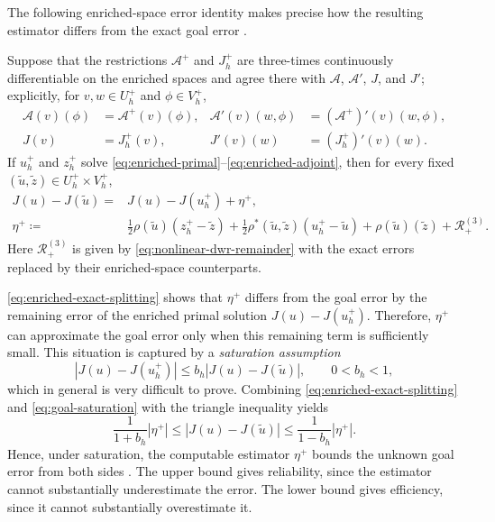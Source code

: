 The following enriched-space error identity makes precise how the resulting estimator differs from the exact goal error \cite[Theorem~2]{ENDTMAYER202419}.
\begin{theorem}
\label{thm:enriched-space-dwr}
Suppose that the restrictions \(\mathcal A^+\) and \(J_h^+\) are three-times continuously differentiable on the enriched spaces and agree there with \(\mathcal A\), \(\mathcal A'\), \(J\), and \(J'\); explicitly, for \(v,w\in U_h^+\) and \(\phi\in V_h^+\),
\begin{align*}
 \mathcal A(v)(\phi)
 &=\mathcal A^+(v)(\phi),
 &
 \mathcal A'(v)(w,\phi)
 &=(\mathcal A^+)'(v)(w,\phi),\\
 J(v)&=J_h^+(v),
 &
 J'(v)(w)&=(J_h^+)'(v)(w).
\end{align*}
If \(u_h^+\) and \(z_h^+\) solve \eqref{eq:enriched-primal}--\eqref{eq:enriched-adjoint}, then for every fixed \((\widetilde u,\widetilde z)\in U_h^+\times V_h^+\),
\begin{align}
 J(u)-J(\widetilde u)
 ={}&J(u)-J(u_h^+)+\eta^+,
 \label{eq:enriched-exact-splitting}\\
 \eta^+
 \coloneqq{}&\tfrac12\rho(\widetilde u)(z_h^+-\widetilde z)
 +\tfrac12\rho^\ast(\widetilde u,\widetilde z)
  (u_h^+-\widetilde u)
 +\rho(\widetilde u)(\widetilde z)
 +\mathcal R_+^{(3)}.
 \label{eq:enriched-nonlinear-dwr}
\end{align}
Here \(\mathcal R_+^{(3)}\) is given by \eqref{eq:nonlinear-dwr-remainder} with the exact errors replaced by their enriched-space counterparts.
\end{theorem}

\cref{eq:enriched-exact-splitting} shows that \(\eta^+\) differs from the goal error by the remaining error of the enriched primal solution \(J(u)-J(u_h^+)\). Therefore, \(\eta^+\) can approximate the goal error only when this remaining term is sufficiently small. This situation is captured by a \emph{saturation assumption} \cite{saturation}
\begin{equation}
|J(u)-J(u_h^+)|
\le b_h |J(u)-J(\widetilde u)|,
\qquad 0<b_h<1,
\label{eq:goal-saturation}
\end{equation}
which in general is very difficult to prove.
Combining \eqref{eq:enriched-exact-splitting} and \eqref{eq:goal-saturation} with the triangle inequality yields
\begin{equation}
\frac{1}{1+b_h}|\eta^+|
\le |J(u)-J(\widetilde u)|
\le \frac{1}{1-b_h}|\eta^+|.
\label{eq:enriched-reliability-efficiency}
\end{equation}
Hence, under saturation, the computable estimator \(\eta^+\) bounds the unknown goal error from both sides \cite{reli_eff}. The upper bound gives reliability, since the estimator cannot substantially underestimate the error. The lower bound gives efficiency, since it cannot substantially overestimate it.

